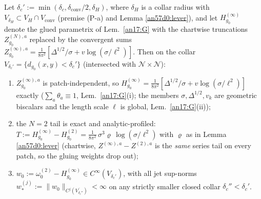 \begin{lemma}\label{an57d0:state}
Let $\delta_c':=\min(\delta_c,\delta_{\mathrm{conv}}/2,\delta_H)$, where
$\delta_H$ is a collar radius with
$V_{\delta_H}\subset V_H\cap V_{\mathrm{conv}}$ (premise (P-a) and Lemma
\ref{an57d0:lever}), and let $H^{(\infty)}_{g_0}$ denote the glued
parametrix of Lem.\ \ref{an17:G} with the chartwise truncations $Z^{(N),a}_{g_0}$
replaced by the convergent sums $Z^{(\infty),a}_{g_0}=\frac1{8\pi^2}
[\Delta^{1/2}/\sigma+v\log(\sigma/\ell^2)]$. Then on the collar
$V_{\delta_c'}=\{d_{g_0}(x,y)<\delta_c'\}$ (intersected with
$\mathcal N\times\mathcal N$):
\begin{enumerate}[label=\textup{(\roman*)},leftmargin=*,nosep]
\item $Z^{(\infty),a}_{g_0}$ is patch-independent, so
  $H^{(\infty)}_{g_0}=\frac1{8\pi^2}[\Delta^{1/2}/\sigma
  +v\log(\sigma/\ell^2)]$ exactly ($\sum_a\theta_a\equiv1$, Lem.~\ref{an17:G}(i); the
  members $\sigma,\Delta^{1/2},v_k$ are geometric biscalars and the length
  scale $\ell$ is global, Lem.~\ref{an17:G}(ii));
\item the $N{=}2$ tail is exact and analytic-profiled:
  $T:=H^{(\infty)}_{g_0}-H^{(2)}_{g_0}
  =\frac1{8\pi^2}\,\sigma^3\varrho\,\log(\sigma/\ell^2)$ with $\varrho$ as
  in Lemma \ref{an57d0:lever} (chartwise, $Z^{(\infty),a}-Z^{(2),a}$ is the
  \emph{same} series tail on every patch, so the gluing weights drop out);
\item $w_0:=\omega^{(2)}_0-H^{(\infty)}_{g_0}\in C^\infty(V_{\delta_c'})$,
  with all jet sup-norms
  $w_*^{(j)}:=\|w_0\|_{C^j(\overline{V_{\delta_c''}})}<\infty$ on any
  strictly smaller closed collar $\delta_c''<\delta_c'$.
\end{enumerate}
\end{lemma}

